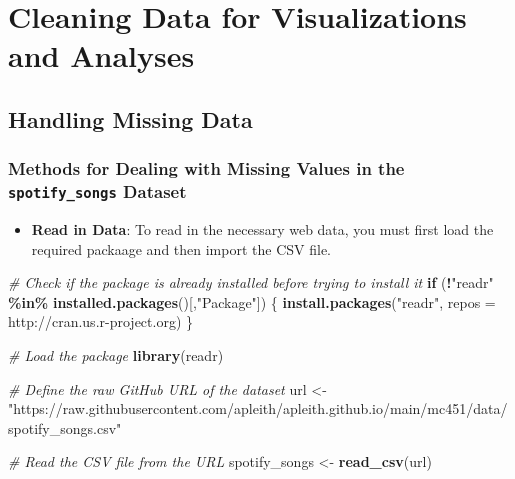 \documentclass[
  b5paper]{book}
\newenvironment{Shaded}{\begin{snugshade}}{\end{snugshade}}
\newcommand{\AttributeTok}[1]{\textcolor[rgb]{0.13,0.29,0.53}{#1}}
\newcommand{\CommentTok}[1]{\textcolor[rgb]{0.56,0.35,0.01}{\textit{#1}}}
\newcommand{\ControlFlowTok}[1]{\textcolor[rgb]{0.13,0.29,0.53}{\textbf{#1}}}
\newcommand{\FunctionTok}[1]{\textcolor[rgb]{0.13,0.29,0.53}{\textbf{#1}}}
\newcommand{\NormalTok}[1]{#1}
\newcommand{\OtherTok}[1]{\textcolor[rgb]{0.56,0.35,0.01}{#1}}
\newcommand{\SpecialCharTok}[1]{\textcolor[rgb]{0.81,0.36,0.00}{\textbf{#1}}}
\newcommand{\StringTok}[1]{\textcolor[rgb]{0.31,0.60,0.02}{#1}}
\providecommand{\tightlist}{%
  \setlength{\itemsep}{0pt}\setlength{\parskip}{0pt}}
\begin{document}
\hypertarget{cleaning-data-for-visualizations-and-analyses}{%
\chapter{Cleaning Data for Visualizations and Analyses}\label{cleaning-data-for-visualizations-and-analyses}}

\hypertarget{handling-missing-data}{%
\section{Handling Missing Data}\label{handling-missing-data}}

\hypertarget{methods-for-dealing-with-missing-values-in-the-spotify_songs-dataset}{%
\subsection{\texorpdfstring{Methods for Dealing with Missing Values in the \texttt{spotify\_songs} Dataset}{Methods for Dealing with Missing Values in the spotify\_songs Dataset}}\label{methods-for-dealing-with-missing-values-in-the-spotify_songs-dataset}}

\begin{itemize}
\tightlist
\item
  \textbf{Read in Data}: To read in the necessary web data, you must first load the required packaage and then import the CSV file.
\end{itemize}

\begin{Shaded}
\begin{Highlighting}[]
\CommentTok{\# Check if the package is already installed before trying to install it}
\ControlFlowTok{if}\NormalTok{ (}\SpecialCharTok{!}\StringTok{"readr"} \SpecialCharTok{\%in\%} \FunctionTok{installed.packages}\NormalTok{()[,}\StringTok{"Package"}\NormalTok{]) \{}
  \FunctionTok{install.packages}\NormalTok{(}\StringTok{"readr"}\NormalTok{, }\AttributeTok{repos =} \StringTok{\textquotesingle{}http://cran.us.r{-}project.org\textquotesingle{}}\NormalTok{)}
\NormalTok{\}}

\CommentTok{\# Load the package}
\FunctionTok{library}\NormalTok{(readr)}

\CommentTok{\# Define the raw GitHub URL of the dataset}
\NormalTok{url }\OtherTok{\textless{}{-}} \StringTok{"https://raw.githubusercontent.com/apleith/apleith.github.io/main/mc451/data/spotify\_songs.csv"}

\CommentTok{\# Read the CSV file from the URL}
\NormalTok{spotify\_songs }\OtherTok{\textless{}{-}} \FunctionTok{read\_csv}\NormalTok{(url)}
\end{Highlighting}
\end{Shaded}
\end{document}
